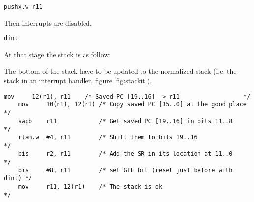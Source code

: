 \documentclass[11pt, oneside]{article}   	%
\begin{document}
\begin{lstlisting}[backgroundcolor=\color{yellow!15}]
    pushx.w r11
\end{lstlisting}

Then interrupts are disabled.

\begin{lstlisting}[backgroundcolor=\color{yellow!15}]
    dint
\end{lstlisting}

At that stage the stack is as follow:

\begin{center}
\end{center}



The bottom of the stack have to be updated to the normalized stack (i.e. the stack in an interrupt handler, figure \ref{fig:stackit}).

\begin{lstlisting}[backgroundcolor=\color{yellow!15}]
    mov     12(r1), r11    /* Saved PC [19..16] -> r11                  */
    mov     10(r1), 12(r1) /* Copy saved PC [15..0] at the good place   */
    swpb    r11            /* Get saved PC [19..16] in bits 11..8       */
    rlam.w  #4, r11        /* Shift them to bits 19..16                 */
    bis     r2, r11        /* Add the SR in its location at 11..0       */
    bis     #8, r11        /* set GIE bit (reset just before with dint) */
    mov     r11, 12(r1)    /* The stack is ok                           */
\end{lstlisting}
\end{document}
